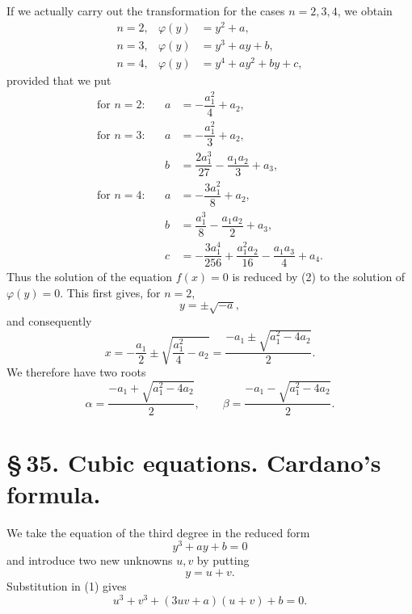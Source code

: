 \documentclass[11pt]{article}
\begin{document}
If we actually carry out the transformation for the cases $n=2,3,4$, we obtain
\begin{equation}
\begin{array}{rcl}
n=2, & \varphi(y)&=y^2+a,\\[0.25em]
n=3, & \varphi(y)&=y^3+ay+b,\\[0.25em]
n=4, & \varphi(y)&=y^4+ay^2+by+c,
\end{array}
\tag{3}
\end{equation}
provided that we put
\begin{equation}
\begin{array}{rcll}
\text{for }n=2:&& a&=-\dfrac{a_1^2}{4}+a_2,\\[0.75em]
\text{for }n=3:&& a&=-\dfrac{a_1^2}{3}+a_2,\\[0.75em]
&& b&=\dfrac{2a_1^3}{27}-\dfrac{a_1a_2}{3}+a_3,\\[0.75em]
\text{for }n=4:&& a&=-\dfrac{3a_1^2}{8}+a_2,\\[0.75em]
&& b&=\dfrac{a_1^3}{8}-\dfrac{a_1a_2}{2}+a_3,\\[0.75em]
&& c&=-\dfrac{3a_1^4}{256}+\dfrac{a_1^2a_2}{16}-\dfrac{a_1a_3}{4}+a_4.
\end{array}
\tag{4}
\end{equation}
Thus the solution of the equation $f(x)=0$ is reduced by (2) to the solution of $\varphi(y)=0$. This first gives, for $n=2$,
\[
 y=\pm\sqrt{-a},
\]
and consequently
\[
 x=-\frac{a_1}{2}\pm\sqrt{\frac{a_1^2}{4}-a_2}
   =\frac{-a_1\pm\sqrt{a_1^2-4a_2}}{2}.
\]
We therefore have two roots
\begin{equation}
\alpha=\frac{-a_1+\sqrt{a_1^2-4a_2}}{2},\qquad
\beta =\frac{-a_1-\sqrt{a_1^2-4a_2}}{2}.
\tag{5}
\end{equation}

\section*{\S\,35. Cubic equations. Cardano's formula.}

We take the equation of the third degree in the reduced form
\begin{equation}
y^3+ay+b=0
\tag{1}
\end{equation}
and introduce two new unknowns $u,v$ by putting
\begin{equation}
y=u+v.
\tag{2}
\end{equation}
Substitution in (1) gives
\begin{equation}
u^3+v^3+(3uv+a)(u+v)+b=0.
\tag{3}
\end{equation}
\end{document}
